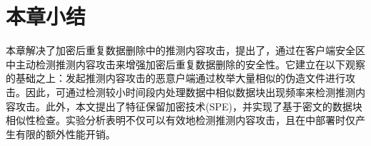 \section{本章小结}
\label{sec:featurespy-conclusion}
本章解决了加密后重复数据删除中的推测内容攻击，提出了\sysnameF，通过在客户端安全区中主动检测推测内容攻击来增强加密后重复数据删除的安全性。它建立在以下观察的基础之上：发起推测内容攻击的恶意户端通过枚举大量相似的伪造文件进行攻击。因此，可通过检测较小时间段内处理数据中相似数据块出现频率来检测推测内容攻击。此外，本文提出了特征保留加密技术(SPE)，并实现了基于密文的数据块相似性检查。实验分析表明\sysnameF 不仅可以有效地检测推测内容攻击，且在\sysnameS 中部署时仅产生有限的额外性能开销。
